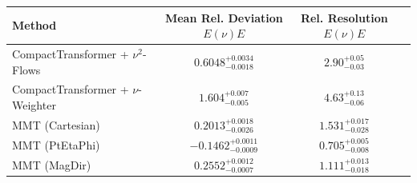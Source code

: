     \begin{tabular}{lccc}
        \toprule
        Method & Mean Rel. Deviation $E(\nu)E$ & Rel. Resolution $E(\nu)E$ \\
        \midrule
        CompactTransformer + $\nu^2$-Flows & $0.6048^{+0.0034}_{-0.0018}$ & $2.90^{+0.05}_{-0.03}$ \\
        CompactTransformer + $\nu$-Weighter & $1.604^{+0.007}_{-0.005}$ & $4.63^{+0.13}_{-0.06}$ \\
        MMT (Cartesian) & $0.2013^{+0.0018}_{-0.0026}$ & $1.531^{+0.017}_{-0.028}$ \\
        MMT (PtEtaPhi) & $-0.1462^{+0.0011}_{-0.0009}$ & $0.705^{+0.005}_{-0.008}$ \\
        MMT (MagDir) & $0.2552^{+0.0012}_{-0.0007}$ & $1.111^{+0.013}_{-0.018}$ \\
        \bottomrule
    \end{tabular}
